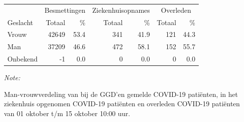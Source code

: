 \documentclass[
  english,
  man,floatsintext]{apa6}
\begin{document}
\begin{table}[H]
\centering\begingroup\fontsize{11}{13}\selectfont

\begin{threeparttable}
\begin{tabular}{lrrrrrr}
\toprule
\multicolumn{1}{c}{ } & \multicolumn{2}{c}{Besmettingen} & \multicolumn{2}{c}{Ziekenhuisopnames} & \multicolumn{2}{c}{Overleden} \\
\cmidrule(l{3pt}r{3pt}){2-3} \cmidrule(l{3pt}r{3pt}){4-5} \cmidrule(l{3pt}r{3pt}){6-7}
Geslacht & Totaal & \% & Totaal & \% & Totaal & \%\\
\midrule
Vrouw & 42649 & 53.4 & 341 & 41.9 & 121 & 44.3\\
Man & 37209 & 46.6 & 472 & 58.1 & 152 & 55.7\\
Onbekend & -1 & 0.0 & 0 & 0.0 & 0 & 0.0\\
\bottomrule
\end{tabular}
\begin{tablenotes}
\item \textit{Note: } 
\item Man-vrouwverdeling van bij de GGD’en gemelde COVID-19 patiënten, in het ziekenhuis opgenomen COVID-19 patiënten en overleden COVID-19 patiënten van 01 oktober t/m 15 oktober 10:00 uur.
\end{tablenotes}
\end{threeparttable}
\endgroup{}
\end{table}
\newpage
\end{document}

